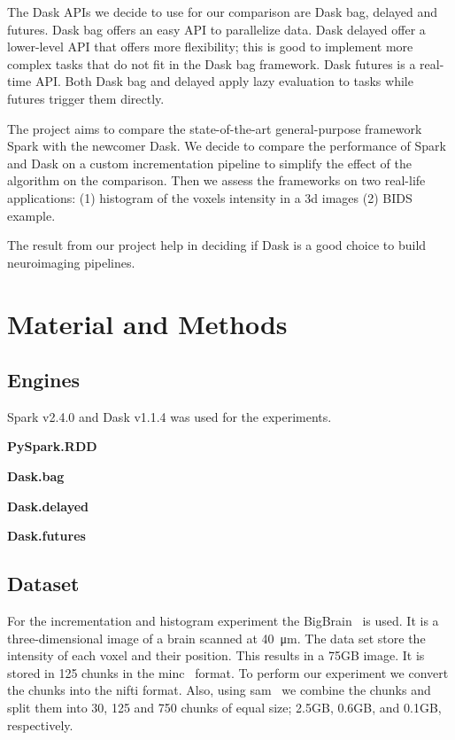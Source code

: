 \documentclass[conference]{IEEEtran}
\begin{document}
The Dask APIs we decide to use for our comparison are Dask bag, delayed and futures.
Dask bag offers an easy API to parallelize data. Dask delayed offer a lower-level API
that offers more flexibility; this is good to implement more complex tasks that do
not fit in the Dask bag framework. Dask futures is a real-time API. Both Dask bag and
delayed apply lazy evaluation to tasks while futures trigger them directly.

The project aims to compare the state-of-the-art general-purpose framework Spark with
the newcomer Dask. We decide to compare the performance of Spark and Dask on a custom
incrementation pipeline to simplify the effect of the algorithm on the comparison.
Then we assess the frameworks on two real-life applications: (1) histogram of the
voxels intensity in a 3d images (2) BIDS example.

The result from our project help in deciding if Dask is a good choice to build
neuroimaging pipelines.


\section{Material and Methods}

\subsection{Engines}
Spark v2.4.0 and Dask v1.1.4 was used for the experiments.

\textbf{PySpark.RDD \cite{spark-rdd}} 

\textbf{Dask.bag \cite{dask-bag}} 

\textbf{Dask.delayed \cite{dask-delayed}} 

\textbf{Dask.futures \cite{dask-futures}} 

\subsection{Dataset}
For the incrementation and histogram experiment the BigBrain~\cite{Amunts:13} is
used. It is a three-dimensional image of a brain scanned at \SI{40}{\micro\metre}.
The data set store the intensity of each voxel and their position. This results in a
75GB image. It is stored in 125 chunks in the minc~\cite{minc} format. To perform our
experiment we convert the chunks into the nifti format. Also, using sam~\cite{sam} we
combine the chunks and split them into 30, 125 and 750 chunks of equal size; 2.5GB,
0.6GB, and 0.1GB, respectively.
\end{document}
